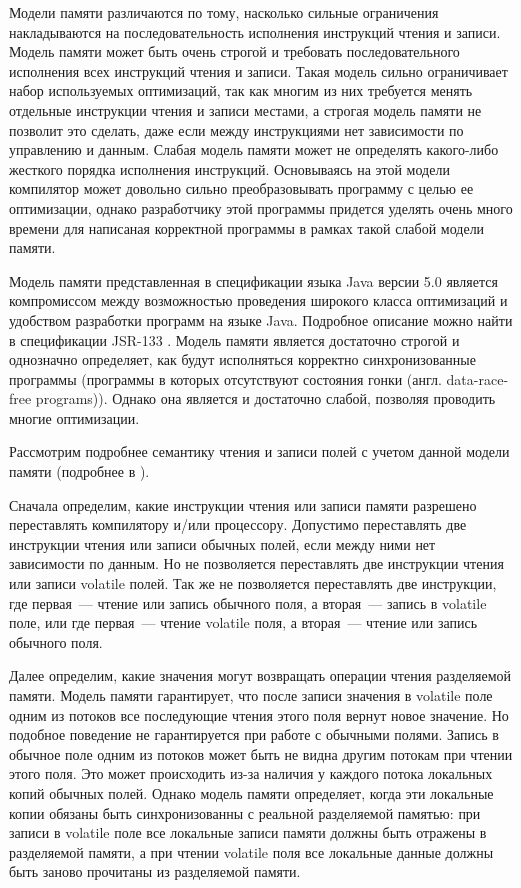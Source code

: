 \documentclass[14pt,titlepage]{extarticle}
\newcommand{\eng}[1]{{\English#1}}
\begin{document}
      Модели памяти различаются по тому, насколько сильные ограничения
      накладываются на последовательность исполнения инструкций чтения и
      записи.
      Модель памяти может быть очень строгой и требовать
      последовательного исполнения всех инструкций чтения и записи.
      Такая модель сильно ограничивает набор используемых оптимизаций,
      так как многим из них требуется менять отдельные инструкции чтения и
      записи местами, а строгая модель памяти не позволит это сделать, даже
      если между инструкциями нет зависимости по управлению и данным.
      Слабая модель памяти может не определять какого-либо жесткого порядка
      исполнения инструкций. Основываясь на этой модели компилятор может
      довольно сильно преобразовывать программу с целью ее оптимизации,
      однако разработчику этой программы придется уделять очень много времени
      для написаная корректной программы в рамках такой слабой модели памяти.

      Модель памяти представленная в спецификации языка Java версии 5.0
      является компромиссом между возможностью проведения широкого класса
      оптимизаций и удобством разработки программ на языке Java. Подробное
      описание можно найти в спецификации JSR-133 \cite{jsr133}. Модель памяти
      является достаточно строгой и однозначно определяет, как будут
      исполняться корректно синхронизованные программы (программы в которых
      отсутствуют состояния гонки (англ. \eng{data-race-free programs})).
      Однако она является и достаточно слабой, позволяя проводить многие
      оптимизации.

      Рассмотрим подробнее семантику чтения и записи полей с учетом данной
      модели памяти (подробнее в \cite{jsr133_cookbook}).

      Сначала определим, какие инструкции чтения или записи памяти разрешено
      переставлять компилятору и/или процессору. Допустимо переставлять две
      инструкции чтения или записи обычных полей, если между ними нет
      зависимости по данным. Но не позволяется переставлять две инструкции
      чтения или записи \eng{volatile} полей. Так же не позволяется
      переставлять две инструкции, где первая~--- чтение или запись обычного
      поля, а вторая~--- запись в \eng{volatile} поле, или где первая~---
      чтение \eng{volatile} поля, а вторая~--- чтение или запись обычного поля.

      Далее определим, какие значения могут возвращать операции чтения
      разделяемой памяти. Модель памяти гарантирует, что после записи значения
      в \eng{volatile} поле одним из потоков все последующие чтения этого поля
      вернут новое значение. Но подобное поведение не гарантируется при работе
      с обычными полями. Запись в обычное поле одним из потоков может быть не
      видна другим потокам при чтении этого поля. Это может происходить из-за
      наличия у каждого потока локальных копий обычных полей.  Однако модель
      памяти определяет, когда эти локальные копии обязаны быть синхронизованны
      с реальной разделяемой памятью: при записи в \eng{volatile} поле все
      локальные записи памяти должны быть отражены в разделяемой памяти, а при
      чтении \eng{volatile} поля все локальные данные должны быть заново
      прочитаны из разделяемой памяти.
\end{document}
